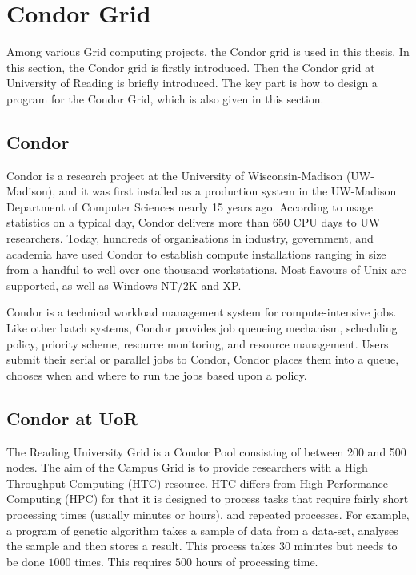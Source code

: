 \section{Condor Grid}\label{sec:condor}
Among various Grid computing projects, the Condor grid \cite{Thain2002} is used in this thesis. In this section, the Condor grid is firstly introduced. Then the Condor grid at University of Reading is briefly introduced. The key part is how to design a program for the Condor Grid, which is also given in this section.

\subsection{Condor}
Condor is a research project at the University of Wisconsin-Madison (UW-Madison), and it was first installed as a production system in the UW-Madison Department of Computer Sciences nearly 15 years ago. According to usage statistics on a typical day, Condor delivers more than $650$ CPU days to UW researchers. Today, hundreds of organisations in industry, government, and academia have used Condor to establish compute installations ranging in size from a handful to well over one thousand workstations. Most flavours of Unix are supported, as well as Windows NT/2K and XP.

Condor is a technical workload management system for compute-intensive jobs. Like other batch systems, Condor provides job queueing mechanism, scheduling policy, priority scheme, resource monitoring, and resource management. Users submit their serial or parallel jobs to Condor, Condor places them into a queue, chooses when and where to run the jobs based upon a policy.

\subsection{Condor at UoR}
The Reading University Grid is a Condor Pool consisting of between 200 and 500 nodes. The aim of the Campus Grid is to provide researchers with a High Throughput Computing (HTC) resource. HTC differs from High Performance Computing (HPC) for that it is designed to process tasks that require fairly short processing times (usually minutes or hours), and repeated processes. For example, a program of genetic algorithm takes a sample of data from a data-set, analyses the sample and then stores a result. This process takes 30 minutes but needs to be done $1000$ times. This requires $500$ hours of processing time.

